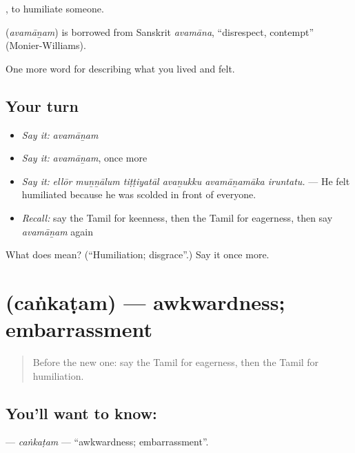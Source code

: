 , to humiliate someone.

\begin{cousinweb}
\textbf{} (\emph{avamāṉam}) is borrowed from Sanskrit \emph{avamāna}, \textquotedblleft{}disrespect, contempt\textquotedblright{} (Monier-Williams).
\end{cousinweb}

\begin{grammarlens}[title={What you've built}]
One more word for describing what you lived and felt.
\end{grammarlens}

\subsection*{Your turn}
\begin{itemize}
\raggedright
  \item \emph{Say it:} \emph{avamāṉam}
  \item \emph{Say it:} \emph{avamāṉam}, once more
  \item \emph{Say it:} \emph{ellōr muṉṉālum tiṭṭiyatāl avaṉukku avamāṉamāka iruntatu.} — He felt humiliated because he was scolded in front of everyone.
  \item \emph{Recall:} say the Tamil for keenness, then the Tamil for eagerness, then say \emph{avamāṉam} again
\end{itemize}

\begin{tcolorbox}[breakable,colback=teal!4,colframe=teal!35!black,title={Before you move on}]
What does  mean? (\textquotedblleft{}Humiliation; disgrace\textquotedblright{}.) Say it once more.
\end{tcolorbox}
\section[\texorpdfstring{\ta{சங்கடம்} (caṅkaṭam)}{சங்கடம் (caṅkaṭam)}]{ (caṅkaṭam) — awkwardness; embarrassment}

\label{lesson:TA-C462-cankatam}



\begin{quote}
Before the new one: say the Tamil for eagerness, then the Tamil for humiliation.
\end{quote}

\subsection*{You'll want to know: }
\textbf{} — \emph{caṅkaṭam} — \textquotedblleft{}awkwardness; embarrassment\textquotedblright{}.

